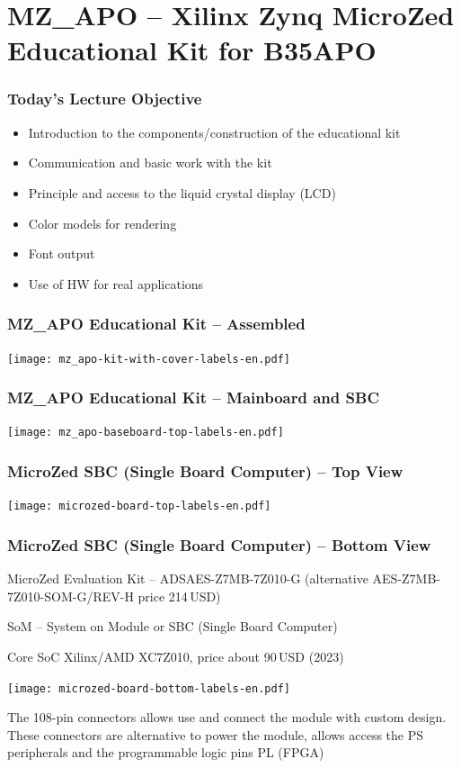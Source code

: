 \documentclass{beamer}
\subtitle{Lecture 08. MZ\_APO Educational Kit (Xilinx Zynq MicroZed APO)}
\author{Pavel Píša \phantom{xxxxxxxxx} Petr Štěpán \\ \small\texttt{pisa@fel.cvut.cz}\phantom{xxxx}\small\texttt{stepan@fel.cvut.cz}}
\begin{document}
\maketitle

\section{MZ\_APO -- Xilinx Zynq MicroZed Educational Kit for B35APO}

\begin{frame}
\frametitle{Today's Lecture Objective}

\begin{itemize}
 \item Introduction to the components/construction of the educational kit
 \item Communication and basic work with the kit
 \item Principle and access to the liquid crystal display (LCD)
 \item Color models for rendering
 \item Font output
 \item Use of HW for real applications
\end{itemize}
\end{frame}

\begin{frame}
\frametitle{MZ\_APO Educational Kit -- Assembled}

\texttt{[image: mz\_apo-kit-with-cover-labels-en.pdf]}

\end{frame}

\begin{frame}
\frametitle{MZ\_APO Educational Kit -- Mainboard and SBC}

\texttt{[image: mz\_apo-baseboard-top-labels-en.pdf]}

\end{frame}

\begin{frame}
\frametitle{MicroZed SBC (Single Board Computer) -- Top View}

\texttt{[image: microzed-board-top-labels-en.pdf]}

\end{frame}

\begin{frame}
\frametitle{MicroZed SBC (Single Board Computer) -- Bottom View}

MicroZed Evaluation Kit -- ADSAES-Z7MB-7Z010-G (alternative AES-Z7MB-7Z010-SOM-G/REV-H price 214\,USD)
\par
SoM -- System on Module or SBC (Single Board Computer)
\par
Core SoC Xilinx/AMD XC7Z010, price about 90\,USD (2023)
\par
\texttt{[image: microzed-board-bottom-labels-en.pdf]}
\par
The 108-pin connectors allows use and connect the module with custom design. These connectors are alternative to power the module, allows access the PS peripherals and the programmable logic pins PL (FPGA)

\end{frame}
\end{document}
